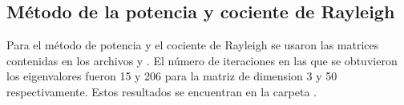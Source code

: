 \subsection{Método de la potencia y cociente de Rayleigh}

Para el método de potencia y el cociente de Rayleigh se usaron las matrices contenidas en los archivos  y . El número de iteraciones en las que se obtuvieron los eigenvalores fueron 15 y 206 para la matriz de dimension 3 y 50 respectivamente. Estos resultados se encuentran en la carpeta .